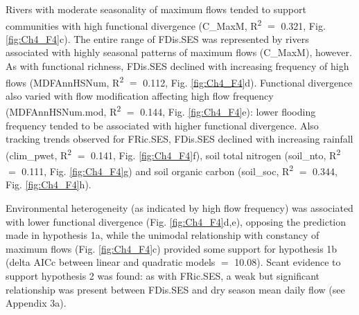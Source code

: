 \documentclass[openright,12pt,a4paper]{memoir}
\begin{document}
Rivers with moderate seasonality of maximum flows tended to support communities with high functional divergence (C\_MaxM, R\textsuperscript{2}  $=$ 0.321, Fig. \ref{fig:Ch4_F4}c). The entire range of FDis.SES was represented by rivers associated with highly seasonal patterns of maximum flows (C\_MaxM), however. As with functional richness, FDis.SES declined with increasing frequency of high flows (MDFAnnHSNum, R\textsuperscript{2}  $=$ 0.112, Fig. \ref{fig:Ch4_F4}d). Functional divergence also varied with flow modification affecting high flow frequency (MDFAnnHSNum.mod, R\textsuperscript{2}  $=$ 0.144, Fig. \ref{fig:Ch4_F4}e): lower flooding frequency tended to be associated with higher functional divergence. Also tracking trends observed for FRic.SES, FDis.SES declined with increasing rainfall (clim\_pwet, R\textsuperscript{2}  $=$ 0.141, Fig. \ref{fig:Ch4_F4}f), soil total nitrogen (soil\_nto, R\textsuperscript{2}  $=$ 0.111, Fig. \ref{fig:Ch4_F4}g) and soil organic carbon (soil\_soc, R\textsuperscript{2}  $=$ 0.344, Fig. \ref{fig:Ch4_F4}h).

Environmental heterogeneity (as indicated by high flow frequency) was associated with lower functional divergence (Fig. \ref{fig:Ch4_F4}d,e), opposing the prediction made in hypothesis 1a, while the unimodal relationship with constancy of maximum flows (Fig. \ref{fig:Ch4_F4}c) provided some support for hypothesis 1b (delta AICc between linear and quadratic models $=$ 10.08). Scant evidence to support hypothesis 2 was found: as with FRic.SES, a weak but significant relationship was present between FDis.SES and dry season mean daily flow (see Appendix 3a).
\end{document}
